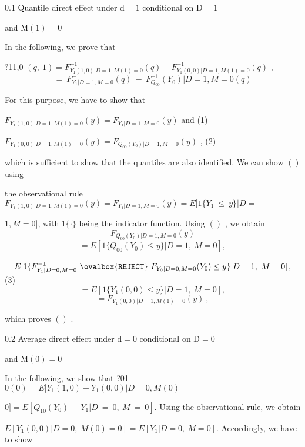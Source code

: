\documentclass[a4paper,12pt]{article}
\begin{document}
0.1 Quantile direct effect under $\mathrm{d}=1$ conditional on $\mathrm{D}=1$

and $\mathrm{M}(1)=0$

In the following, we prove that
\begin{center}
?11,0 $(q,\ 1) = F_{Y_{1}(1,0)|D=1,M(1)=0}^{-1}(q) - F_{Y_{1}(0,0)|D=1,M(1)=0}^{-1}(q)$ ,
$$
=\ F_{Y_{1}|D=1,M=0}^{-1}(q)\ -\ F_{Q_{00}}^{-1}(Y_{0})|D=1,M=0(q)
$$
\end{center}
For this purpose, we have to show that
\begin{center}
$F_{Y_{1}(1,0)|D=1,M(1)=0}(y)=F_{Y_{1}|D=1,M=0}(y)$ and   (1)

$F_{Y_{1}(0,0)|D=1,M(1)=0}(y)=F_{Q_{00}(Y_{0})|D=1,M=0}(y)$ ,   (2)
\end{center}
which is sufficient to show that the quantiles are also identified. We can show $()$ using

the observational rule $F_{Y_{1}(1,0)|D=1,M(1)=0}(y) = F_{Y_{1}|D=1,M=0}(y) = E[1\{Y_{1}\ \leq\ y\}|D =$

$1, M=0]$, with $1\{\cdot\}$ being the indicator function. Using $()$ , we obtain
$$
F_{Q_{00}(Y_{0})|D=1,M=0}(y)
$$
$$
=E[1\{Q_{00}(Y_{0})\leq y\}|D=1,\ M=0],
$$
\begin{center}
$=E[1\{F_{Y_{1}|D=0,M=0}^{-1}\ \ovalbox{\tt\small REJECT}\ F_{Y_{0}|D=0,M=0}(Y_{0})\leq y\}|D=1,\ M=0]$,   (3)
$$
=E[1\{Y_{1}(0,0)\leq y\}|D=1,\ M=0],
$$
$$
=F_{Y_{1}(0,0)|D=1,M(1)=0}(y)\ ,
$$
\end{center}
which proves $()$ .

0.2 Average direct effect under $\mathrm{d}=0$ conditional on $\mathrm{D}=0$

and $\mathrm{M}(0)=0$

In the following, we show that ?01 $0(0) = E[Y_{1}(1,0) -Y_{1}(0,0)|D = 0, M(0) =$

$0] = E[Q_{10}(Y_{0})\ -Y_{1}|D\ =\ 0,\ M\ =\ 0]$. Using the observational rule, we obtain

$E[Y_{1}(0,0)|D=0,\ M(0)=0]=E[Y_{1}|D=0,\ M=0]$. Accordingly, we have to show
\end{document}
